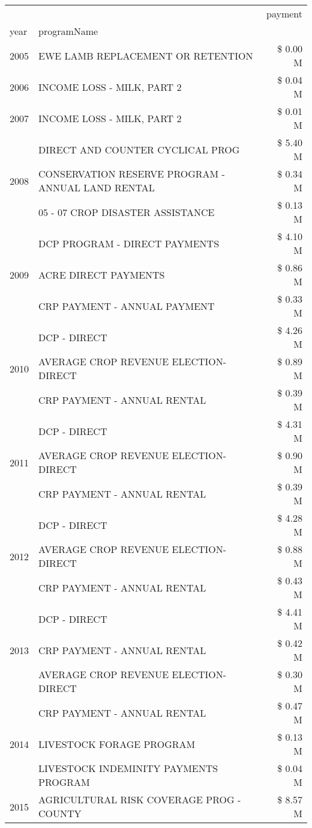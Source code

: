 \begin{tabular}{llr}
\toprule
 &  & payment \\
year & programName &  \\
\midrule
2005 & EWE LAMB REPLACEMENT OR RETENTION & \$ 0.00 M \\
\cline{1-3}
2006 & INCOME LOSS - MILK, PART 2 & \$ 0.04 M \\
\cline{1-3}
2007 & INCOME LOSS - MILK, PART 2 & \$ 0.01 M \\
\cline{1-3}
\multirow[t]{3}{*}{2008} & DIRECT AND COUNTER CYCLICAL PROG & \$ 5.40 M \\
 & CONSERVATION RESERVE PROGRAM - ANNUAL LAND RENTAL & \$ 0.34 M \\
 & 05 - 07 CROP DISASTER ASSISTANCE & \$ 0.13 M \\
\cline{1-3}
\multirow[t]{3}{*}{2009} & DCP PROGRAM - DIRECT PAYMENTS & \$ 4.10 M \\
 & ACRE DIRECT PAYMENTS & \$ 0.86 M \\
 & CRP PAYMENT - ANNUAL PAYMENT & \$ 0.33 M \\
\cline{1-3}
\multirow[t]{3}{*}{2010} & DCP - DIRECT & \$ 4.26 M \\
 & AVERAGE CROP REVENUE ELECTION-DIRECT & \$ 0.89 M \\
 & CRP PAYMENT - ANNUAL RENTAL & \$ 0.39 M \\
\cline{1-3}
\multirow[t]{3}{*}{2011} & DCP - DIRECT & \$ 4.31 M \\
 & AVERAGE CROP REVENUE ELECTION-DIRECT & \$ 0.90 M \\
 & CRP PAYMENT - ANNUAL RENTAL & \$ 0.39 M \\
\cline{1-3}
\multirow[t]{3}{*}{2012} & DCP - DIRECT & \$ 4.28 M \\
 & AVERAGE CROP REVENUE ELECTION-DIRECT & \$ 0.88 M \\
 & CRP PAYMENT - ANNUAL RENTAL & \$ 0.43 M \\
\cline{1-3}
\multirow[t]{3}{*}{2013} & DCP - DIRECT & \$ 4.41 M \\
 & CRP PAYMENT - ANNUAL RENTAL & \$ 0.42 M \\
 & AVERAGE CROP REVENUE ELECTION-DIRECT & \$ 0.30 M \\
\cline{1-3}
\multirow[t]{3}{*}{2014} & CRP PAYMENT - ANNUAL RENTAL & \$ 0.47 M \\
 & LIVESTOCK FORAGE PROGRAM & \$ 0.13 M \\
 & LIVESTOCK INDEMINITY PAYMENTS PROGRAM & \$ 0.04 M \\
\cline{1-3}
\multirow[t]{3}{*}{2015} & AGRICULTURAL RISK COVERAGE PROG - COUNTY & \$ 8.57 M \\

\end{tabular}
